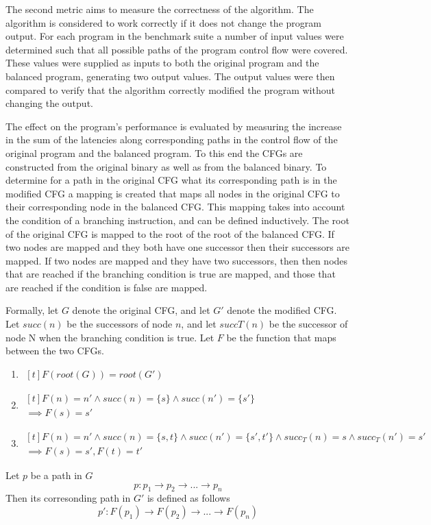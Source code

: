 The second metric aims to measure the correctness of the algorithm. The algorithm is considered to work correctly if it does not change the program output. For each program in the benchmark suite a number of input values were determined such that all possible paths of the program control flow were covered.
These values were supplied as inputs to both the original program and the balanced program, generating two output values. The output values were then compared to 
verify that the algorithm correctly modified the program without changing the output. 

The effect on the program's performance is evaluated by measuring the increase in the sum of the latencies along corresponding paths 
in the control flow of the original program and the balanced program. To this end the CFGs are constructed from the original binary as well as from the balanced binary.
To determine for a path in the original CFG what its corresponding path is in the modified CFG a mapping is created that maps all nodes in the original CFG to their corresponding node in the balanced CFG. 
This mapping takes into account the condition of a branching instruction, and can be defined inductively. 
The root of the original CFG is mapped to the root of the root of the balanced CFG. 
If two nodes are mapped and they both have one successor then their successors are mapped. 
If two nodes are mapped and they have two successors, then then nodes that are reached if the branching condition is true are mapped,
and those that are reached if the condition is false are mapped.

Formally, let $G$ denote the original CFG, and let $G'$ denote the modified CFG. Let $succ(n)$ be the successors of node $n$, and let $succT(n)$ be 
the successor of node N when the branching condition is true. Let $F$ be the function that maps between the two CFGs.  
\begin{enumerate}
    \item $\begin{aligned}[t]
    F(root(G)) = root(G')
\end{aligned}$
\item $\begin{aligned}[t]
    F(n) = n' \land succ(n) = \{s\} \land succ(n')=\{s'\} \\ 
    \implies F(s)=s'
\end{aligned}$
\item $\begin{aligned}[t]
    F(n) = n' \land succ(n) = \{s, t\} \land succ(n')=\{s', t'\} \land succ_T(n)=s \land succ_T(n') = s'\\
    \implies F(s)=s', F(t) = t'
\end{aligned}$
\end{enumerate}
Let $p$ be a path in $G$
$$ p: p_1 \rightarrow p_2 \rightarrow ... \rightarrow p_n$$
Then its corresonding path in $G'$ is defined as follows 
$$ p': F(p_1) \rightarrow F(p_2) \rightarrow ... \rightarrow F(p_n)$$

